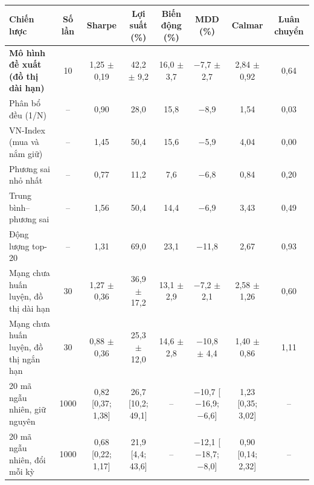 \begin{tabular}{@{}lccccccc@{}}
\toprule
Chiến lược & Số lần & Sharpe & Lợi suất (\%) & Biến động (\%) & MDD (\%) & Calmar & Luân chuyển \\
\midrule
\textbf{Mô hình đề xuất (đồ thị dài hạn)} & 10 & 1{,}25 $\pm$ 0{,}19 & 42{,}2 $\pm$ 9{,}2 & 16{,}0 $\pm$ 3{,}7 & $-$7{,}7 $\pm$ 2{,}7 & 2{,}84 $\pm$ 0{,}92 & 0{,}64 \\
\midrule
Phân bổ đều (1/N) & -- & 0{,}90 & 28{,}0 & 15{,}8 & $-$8{,}9 & 1{,}54 & 0{,}03 \\
VN-Index (mua và nắm giữ) & -- & 1{,}45 & 50{,}4 & 15{,}6 & $-$5{,}9 & 4{,}04 & 0{,}00 \\
Phương sai nhỏ nhất & -- & 0{,}77 & 11{,}2 & 7{,}6 & $-$6{,}8 & 0{,}84 & 0{,}20 \\
Trung bình--phương sai & -- & 1{,}56 & 50{,}4 & 14{,}4 & $-$6{,}9 & 3{,}43 & 0{,}49 \\
Động lượng top-20 & -- & 1{,}31 & 69{,}0 & 23{,}1 & $-$11{,}8 & 2{,}67 & 0{,}93 \\
\midrule
Mạng chưa huấn luyện, đồ thị dài hạn & 30 & 1{,}27 $\pm$ 0{,}36 & 36{,}9 $\pm$ 17{,}2 & 13{,}1 $\pm$ 2{,}9 & $-$7{,}2 $\pm$ 2{,}1 & 2{,}58 $\pm$ 1{,}26 & 0{,}60 \\
Mạng chưa huấn luyện, đồ thị ngắn hạn & 30 & 0{,}88 $\pm$ 0{,}36 & 25{,}3 $\pm$ 12{,}0 & 14{,}6 $\pm$ 2{,}8 & $-$10{,}8 $\pm$ 4{,}4 & 1{,}40 $\pm$ 0{,}86 & 1{,}11 \\
\midrule
20 mã ngẫu nhiên, giữ nguyên & 1000 & 0{,}82 [0{,}37; 1{,}38] & 26{,}7 [10{,}2; 49{,}1] & -- & $-$10{,}7 [$-$16{,}9; $-$6{,}6] & 1{,}23 [0{,}35; 3{,}02] & -- \\
20 mã ngẫu nhiên, đổi mỗi kỳ & 1000 & 0{,}68 [0{,}22; 1{,}17] & 21{,}9 [4{,}4; 43{,}6] & -- & $-$12{,}1 [$-$18{,}7; $-$8{,}0] & 0{,}90 [0{,}14; 2{,}32] & -- \\
\bottomrule
\end{tabular}
